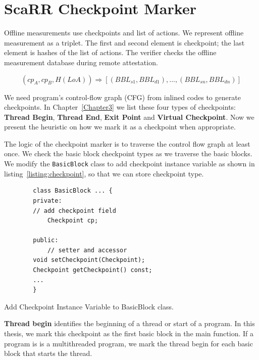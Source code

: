 \section{ScaRR Checkpoint Marker} 
\label{sec:scarr-checkpoint-marker}


Offline measurements use checkpoints and list of actions. We represent offline
measurement as a triplet. The first and second element is checkpoint; the last
element is hashes of the list of actions. The verifier checks the offline
measurement database during remote attestation.

$$(cp_A, cp_B, H(LoA)) \Rightarrow [(BBL_{s1}, BBL_{d1}), ..., (BBL_{sn},
BBL_{dn})]$$

We need program's control-flow graph (CFG) from inlined codes to generate
checkpoints. In Chapter~\ref{Chapter3} we list these four types of checkpoints:
\textbf{Thread Begin}, \textbf{Thread End}, \textbf{Exit Point} and
\textbf{Virtual Checkpoint}. Now we present the heuristic on how we mark it as a
checkpoint when appropriate.  

The logic of the checkpoint marker is to traverse the control flow graph at
least once. We check the basic block checkpoint types as we traverse the basic
blocks. We modify the \texttt{BasicBlock} class to add checkpoint instance variable as
shown in listing~\ref{listing:checkpoint}, so that we can store checkpoint type.

\begin{listing}[htbp]
    \begin{verbatim}
        class BasicBlock ... {
        private:
        // add checkpoint field
            Checkpoint cp;

        public:
            // setter and accessor
        void setCheckpoint(Checkpoint);
        Checkpoint getCheckpoint() const;
        ...
        }
    \end{verbatim}
    \caption{Add Checkpoint Instance Variable to BasicBlock class.}    
    \label{listing:checkpoint}
\end{listing}

\vspace{0.5cm}
\noindent \textbf{Thread begin} identifies the beginning of a thread or start of
a program. In this thesis, we mark this checkpoint as the first basic block in
the main function. If a program is is a multithreaded program, we mark the
thread begin for each basic block that starts the thread.

